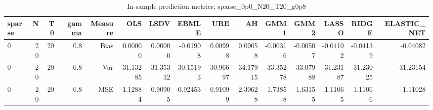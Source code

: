 \begin{table}[!htbp]\centering
\caption{In-sample prediction metrics: sparse_0p0_N20_T20_g0p8}
\label{tab:table2_sparse_0p0_N20_T20_g0p8}
\begin{tabular}{lrrrrrrrrrrrrrr}
\hline
sparse & N & T0 & gamma & Measure & OLS & LSDV & EBMLE & URE & AH & GMM1 & GMM2 & LASSO & RIDGE & ELASTIC_NET \\
\hline
0 & 20 & 20 & 0.8 & Bias & 0.00000 & 0.00000 & -0.01908 & 0.00998 & 0.00058 & -0.00316 & -0.00507 & -0.04102 & -0.04139 & -0.04082 \\
0 & 20 & 20 & 0.8 & Var & 31.13285 & 31.35332 & 30.15193 & 30.96697 & 34.17915 & 33.35278 & 33.07988 & 31.23187 & 31.23025 & 31.23154 \\
0 & 20 & 20 & 0.8 & MSE & 1.12884 & 0.90905 & 0.92453 & 0.91099 & 2.30628 & 1.73858 & 1.63155 & 1.11065 & 1.11066 & 1.11028 \\
\hline
\end{tabular}
\end{table}

